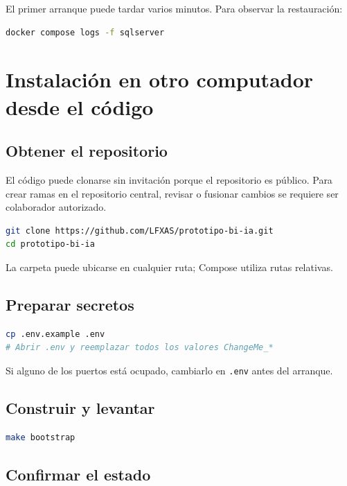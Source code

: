 \documentclass[11pt,letterpaper]{article}
\newcommand{\file}[1]{\texttt{#1}}
\begin{document}
El primer arranque puede tardar varios minutos. Para observar la restauración:

\begin{lstlisting}[style=terminal,language=bash]
docker compose logs -f sqlserver
\end{lstlisting}

\section{Instalación en otro computador desde el código}

\subsection{Obtener el repositorio}

El código puede clonarse sin invitación porque el repositorio es público. Para crear ramas en el repositorio central, revisar o fusionar cambios se requiere ser colaborador autorizado.

\begin{lstlisting}[style=terminal,language=bash]
git clone https://github.com/LFXAS/prototipo-bi-ia.git
cd prototipo-bi-ia
\end{lstlisting}

La carpeta puede ubicarse en cualquier ruta; Compose utiliza rutas relativas.

\subsection{Preparar secretos}

\begin{lstlisting}[style=terminal,language=bash]
cp .env.example .env
# Abrir .env y reemplazar todos los valores ChangeMe_*
\end{lstlisting}

Si alguno de los puertos está ocupado, cambiarlo en \file{.env} antes del arranque.

\subsection{Construir y levantar}

\begin{lstlisting}[style=terminal,language=bash]
make bootstrap
\end{lstlisting}

\subsection{Confirmar el estado}
\end{document}

